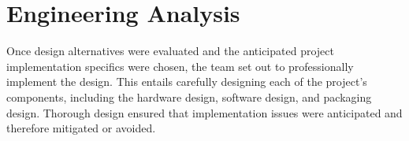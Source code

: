 \chapter{Engineering Analysis}

Once design alternatives were evaluated and the anticipated project implementation specifics were chosen, the team set out to professionally implement the design.
This entails carefully designing each of the project's components, including the hardware design, software design, and packaging design.
Thorough design ensured that implementation issues were anticipated and therefore mitigated or avoided.





